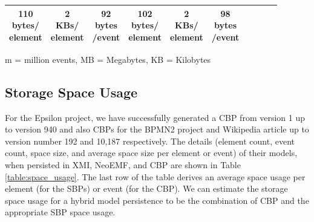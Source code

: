 \begin{table}[ht]
\begin{footnotesize}
\begin{tabular}{| c | c  c  c | c  c  c | c c c |}
            \makecell{110\\bytes/\\element} & \makecell{2\\KBs/\\element}  & \makecell{92\\bytes\\/event} &  
            \makecell{102\\bytes/\\element} & \makecell{2\\KBs/\\element} & \makecell{98\\bytes\\/event}  \\
            \hline 
        \end{tabular}
        \justify
        m = million events, MB = Megabytes, KB = Kilobytes
    \end{footnotesize}
\end{table}

\vspace{-25pt}
\subsection{Storage Space Usage}
\label{sec:storage_space_usage}

\vspace{-5pt}
For the Epsilon project, we have successfully generated a CBP from version 1 up to version 940 and also CBPs for the BPMN2 project and Wikipedia article up to version number 192 and 10,187 respectively. The details (element count, event count, space size, and average space size per element or event) of their models, when persisted in XMI, NeoEMF, and CBP are shown in Table \ref{table:space_usage}. The last row of the table derives an average space usage per element (for the SBPs) or event (for the CBP). We can estimate the storage space usage for a hybrid model persistence to be the combination of CBP and the appropriate SBP space usage.


